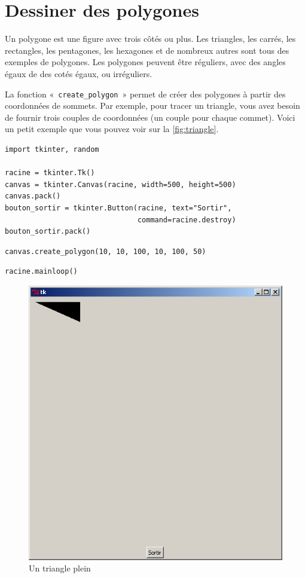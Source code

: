 \section{Dessiner des polygones}
Un polygone est une figure avec trois côtés ou plus. 
Les triangles, les carrés, les rectangles, les pentagones, les hexagones et de nombreux autres sont tous des exemples de polygones. Les polygones peuvent être réguliers, avec des angles égaux de des cotés égaux, ou irréguliers. 

La fonction « \texttt{create\_polygon} » permet de créer des polygones à partir des coordonnées de sommets.
Par exemple, pour tracer un triangle, vous avez besoin de fournir trois couples de coordonnées (un couple pour chaque commet). Voici un petit exemple que vous pouvez voir sur la \autoref{fig:triangle}.

\begin{Verbatim}[frame=single,rulecolor=\color{mbleu}, label=à taper ne sera pas répété]
import tkinter, random

racine = tkinter.Tk()
canvas = tkinter.Canvas(racine, width=500, height=500)
canvas.pack()
bouton_sortir = tkinter.Button(racine, text="Sortir",
                               command=racine.destroy)
bouton_sortir.pack()
\end{Verbatim}
\begin{Verbatim}[frame=single,rulecolor=\color{mbleu}, label=à taper]
canvas.create_polygon(10, 10, 100, 10, 100, 50)
\end{Verbatim}
\begin{Verbatim}[frame=single,rulecolor=\color{mbleu}, label=à taper ne sera pas répété]
racine.mainloop()
\end{Verbatim}

\begin{figure}[h!]
\centering
\includegraphics[scale=0.4]{images/triangle}
\caption{Un triangle plein}\label{fig:triangle}
\end{figure}

